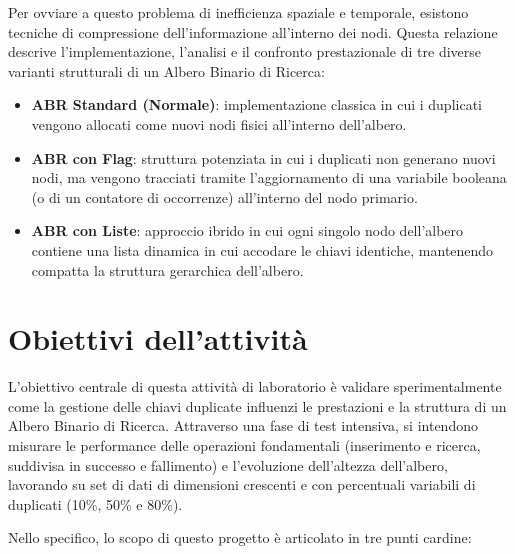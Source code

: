 \documentclass[11pt,a4paper]{article}
\begin{document}
Per ovviare a questo problema di inefficienza spaziale e temporale, esistono tecniche di compressione dell'informazione all'interno dei nodi. Questa relazione descrive l'implementazione, l'analisi e il confronto prestazionale di tre diverse varianti strutturali di un Albero Binario di Ricerca:

\begin{itemize}
    \item \textbf{ABR Standard (Normale)}: implementazione classica in cui i duplicati vengono allocati come nuovi nodi fisici all'interno dell'albero.
    \item \textbf{ABR con Flag}: struttura potenziata in cui i duplicati non generano nuovi nodi, ma vengono tracciati tramite l'aggiornamento di una variabile booleana (o di un contatore di occorrenze) all'interno del nodo primario.
    \item \textbf{ABR con Liste}: approccio ibrido in cui ogni singolo nodo dell'albero contiene una lista dinamica in cui accodare le chiavi identiche, mantenendo compatta la struttura gerarchica dell'albero.
\end{itemize}

\section{Obiettivi dell'attività}

L'obiettivo centrale di questa attività di laboratorio è validare sperimentalmente come la gestione delle chiavi duplicate influenzi le prestazioni e la struttura di un Albero Binario di Ricerca. Attraverso una fase di test intensiva, si intendono misurare le performance delle operazioni fondamentali (inserimento e ricerca, suddivisa in successo e fallimento) e l'evoluzione dell'altezza dell'albero, lavorando su set di dati di dimensioni crescenti e con percentuali variabili di duplicati (10\%, 50\% e 80\%).

Nello specifico, lo scopo di questo progetto è articolato in tre punti cardine:
\end{document}
